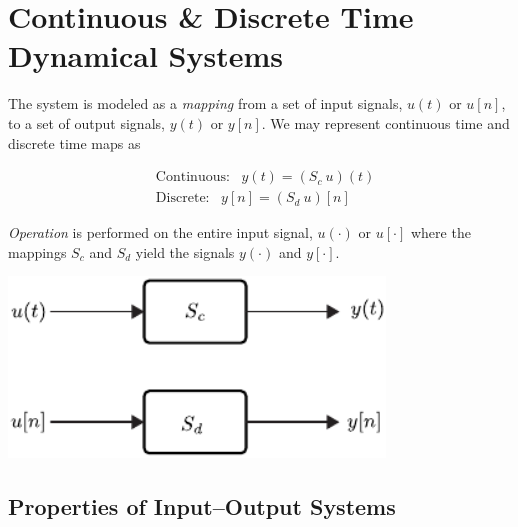 \documentclass[12pt,oneside]{amsart}
\begin{document}
\newpage

\section{Continuous \& Discrete Time Dynamical Systems} 

The system is modeled as a \textit{mapping} from a set of input
signals, $u(t)$ or $u[n]$, to a set of output signals, $y(t)$ or $y[n]$.
We may represent continuous time and discrete time maps as

\begin{align*}
  &\mathrm{Continuous}: \ \ \ y(t) = (S_c \ u) (t) \\
  &\mathrm{Discrete}: \ \ \ y[n] = (S_d \ u) [n] 
\end{align*}

\vspace{6pt}

\textit{Operation} is performed on the entire input signal, $u(\cdot)$ or
$u[\cdot]$ where the mappings $S_c$ and $S_d$ yield the signals
$y(\cdot)$ and $y[\cdot]$. 

\vspace{12pt}

    \begin{center}
  \begin{minipage}[h]{0.9\linewidth}
    \begin{center}
      \includegraphics[width=0.75\textwidth]{blocks}
    \end{center}
  \end{minipage}
    \end{center}

\vspace{12pt}

\subsection{Properties of Input--Output Systems}
\end{document}
